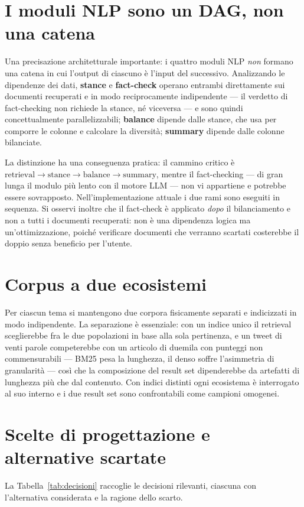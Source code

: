 \documentclass[11pt,a4paper]{report}
\begin{document}
\section{I moduli NLP sono un DAG, non una catena}\label{sec:modularita}
Una precisazione architetturale importante: i quattro moduli NLP \emph{non} formano una catena
in cui l'output di ciascuno è l'input del successivo. Analizzando le dipendenze dei dati,
\textbf{stance} e \textbf{fact-check} operano entrambi direttamente sui documenti recuperati e
in modo reciprocamente indipendente --- il verdetto di fact-checking non richiede la stance, né
viceversa --- e sono quindi concettualmente parallelizzabili; \textbf{balance} dipende dalle
stance, che usa per comporre le colonne e calcolare la diversità; \textbf{summary} dipende dalle
colonne bilanciate.

La distinzione ha una conseguenza pratica: il cammino critico è
$\text{retrieval} \to \text{stance} \to \text{balance} \to \text{summary}$, mentre il
fact-checking --- di gran lunga il modulo più lento con il motore LLM --- non vi appartiene e
potrebbe essere sovrapposto. Nell'implementazione attuale i due rami sono eseguiti in sequenza.
Si osservi inoltre che il fact-check è applicato \emph{dopo} il bilanciamento e non a tutti i
documenti recuperati: non è una dipendenza logica ma un'ottimizzazione, poiché verificare
documenti che verranno scartati costerebbe il doppio senza beneficio per l'utente.

\section{Corpus a due ecosistemi}
Per ciascun tema si mantengono due corpora fisicamente separati e indicizzati in modo
indipendente. La separazione è essenziale: con un indice unico il retrieval scegliere\-bbe fra le
due popolazioni in base alla sola pertinenza, e un tweet di venti parole competerebbe con un
articolo di duemila con punteggi non commensurabili --- BM25 pesa la lunghezza, il denso soffre
l'asimmetria di granularità --- così che la composizione del result set dipenderebbe da artefatti
di lunghezza più che dal contenuto. Con indici distinti ogni ecosistema è interrogato al suo
interno e i due result set sono confrontabili come campioni omogenei.

\section{Scelte di progettazione e alternative scartate}
La Tabella~\ref{tab:decisioni} raccoglie le decisioni rilevanti, ciascuna con l'alternativa
considerata e la ragione dello scarto.
\end{document}
